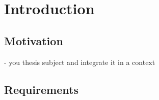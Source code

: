 
\chapter{Introduction}\label{cap:intro}

\section{Motivation}\label{sect:motivation}

- you thesis subject and integrate it in a context

\section{Requirements}

